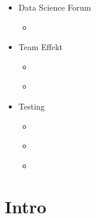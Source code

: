 \documentclass[letterpaper,10pt,english]{jupyterBook}
\begin{document}
\begin{itemize}
\item {} 
\sphinxAtStartPar
Data Science Forum

\begin{itemize}
\item {} 
\sphinxAtStartPar
{\hyperref[\detokenize{src/dsforum/fake_synth/DSF_intro::doc}]{}}

\end{itemize}
\end{itemize}
\begin{itemize}
\item {} 
\sphinxAtStartPar
Team Effekt

\begin{itemize}
\item {} 
\sphinxAtStartPar
{\hyperref[\detokenize{src/effect/intro::doc}]{}}

\item {} 
\sphinxAtStartPar
{\hyperref[\detokenize{src/effect/ventetid::doc}]{}}

\end{itemize}
\end{itemize}
\begin{itemize}
\item {} 
\sphinxAtStartPar
Testing

\begin{itemize}
\item {} 
\sphinxAtStartPar
{\hyperref[\detokenize{src/test/markdown-notebooks::doc}]{}}

\item {} 
\sphinxAtStartPar
{\hyperref[\detokenize{src/test/SynthNAV0::doc}]{}}

\item {} 
\sphinxAtStartPar
{\hyperref[\detokenize{src/test/SyntheticNAV::doc}]{}}

\end{itemize}
\end{itemize}

\sphinxstepscope


\part{Intro}
\end{document}
